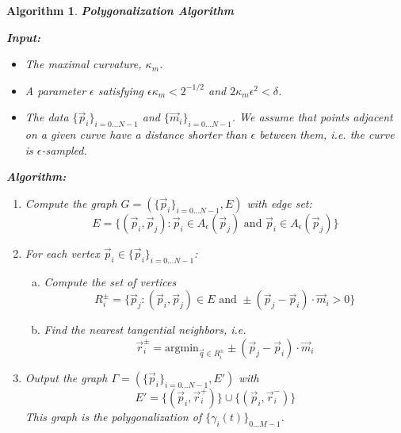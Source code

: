\documentclass{article}
\newtheorem{algo}{Algorithm}
\numberwithin{cntr}{section}
\numberwithin{equation}{section}
\newcommand{\vp}[0]{{\vec{p}}}
\newcommand{\vq}[0]{{\vec{q}}}
\newcommand{\vr}[0]{{\vec{r}}}
\newcommand{\vm}[0]{{\vec{m}}}
\newcommand{\Oto}[1]{{0 \ldots #1-1}}
\newcommand{\OtoN}{{0 \ldots N-1}}
\newcommand{\pointData}{{ \{ \vp_{i} \}_{i=\OtoN} }}
\newcommand{\tanData}{{ \{ \vm_{i} \}_{i=\OtoN} }}
\newcommand{\curveSet}{{ \{ \gamma_i(t) \}_{\Oto{M}}}}
\newcommand{\allowed}[2]{ { A_{#1}(#2) } }
\newcommand{\kmax}{{\kappa_{m}}}
\newcommand{\curvesep}{{\delta}}
\begin{document}
\begin{algo}
  \label{algo:polygonalization}
  {\bf Polygonalization Algorithm }

  { \bf Input: }

  \begin{itemize}
  \item The maximal curvature, $\kmax$.
  \item A parameter $\epsilon$ satisfying $\epsilon \kmax < 2^{-1/2}$ and $2 \kmax \epsilon^{2} < \curvesep$.
  \item The data $\pointData$ and $\tanData$. We assume that points adjacent on a given curve have a distance shorter than $\epsilon$ between them, i.e. the curve is $\epsilon$-sampled.
  \end{itemize}


  {\bf Algorithm: }

  \begin{enumerate}
  \item Compute the graph $G = (\pointData, E)$ with edge set:
    \begin{equation*}
      E = \{ (\vp_{i},\vp_{j}) : \vp_{i} \in \allowed{\epsilon}{\vp_{j}} \textrm{~and~} \vp_{i} \in \allowed{\epsilon}{\vp_{j}}\}
    \end{equation*}
  \item For each vertex $\vp_{i} \in \pointData$:
    \begin{enumerate}[a.]
    \item Compute the set of vertices
      \begin{equation*}
        R^{\pm}_{i} = \{ \vp_{j} : (\vp_{i}, \vp_{j}) \in E \textrm{~and~} \pm (\vp_{j}-\vp_{i}) \cdot \vm_{i} > 0 \}
      \end{equation*}
    \item Find the nearest tangential neighbors, i.e.
      \begin{equation*}
        \vr^{\pm}_{i} = \textrm{argmin}_{\vq \in R^{\pm}_{i}} \pm (\vp_{j}-\vp_{i}) \cdot \vm_{i}
      \end{equation*}
    \end{enumerate}
  \item Output the graph $\Gamma = ( \pointData, E')$ with
    \begin{equation*}
      E' = \{ (\vp_{i}, \vr^{+}_{i}) \} \cup \{ (\vp_{i}, \vr^{-}_{i}) \}
    \end{equation*}
    This graph is the polygonalization of $\curveSet$.
  \end{enumerate}

\end{algo}
\end{document}
